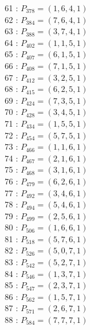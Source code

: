 \documentclass{article}
\begin{document}
{\begin{multicols}{3}
61 : $P_{378}=( 1, 6, 4, 1 )$\\
62 : $P_{384}=( 7, 6, 4, 1 )$\\
63 : $P_{388}=( 3, 7, 4, 1 )$\\
64 : $P_{402}=( 1, 1, 5, 1 )$\\
65 : $P_{407}=( 6, 1, 5, 1 )$\\
66 : $P_{408}=( 7, 1, 5, 1 )$\\
67 : $P_{412}=( 3, 2, 5, 1 )$\\
68 : $P_{415}=( 6, 2, 5, 1 )$\\
69 : $P_{424}=( 7, 3, 5, 1 )$\\
70 : $P_{428}=( 3, 4, 5, 1 )$\\
71 : $P_{434}=( 1, 5, 5, 1 )$\\
72 : $P_{454}=( 5, 7, 5, 1 )$\\
73 : $P_{466}=( 1, 1, 6, 1 )$\\
74 : $P_{467}=( 2, 1, 6, 1 )$\\
75 : $P_{468}=( 3, 1, 6, 1 )$\\
76 : $P_{479}=( 6, 2, 6, 1 )$\\
77 : $P_{492}=( 3, 4, 6, 1 )$\\
78 : $P_{494}=( 5, 4, 6, 1 )$\\
79 : $P_{499}=( 2, 5, 6, 1 )$\\
80 : $P_{506}=( 1, 6, 6, 1 )$\\
81 : $P_{518}=( 5, 7, 6, 1 )$\\
82 : $P_{526}=( 5, 0, 7, 1 )$\\
83 : $P_{542}=( 5, 2, 7, 1 )$\\
84 : $P_{546}=( 1, 3, 7, 1 )$\\
85 : $P_{547}=( 2, 3, 7, 1 )$\\
86 : $P_{562}=( 1, 5, 7, 1 )$\\
87 : $P_{571}=( 2, 6, 7, 1 )$\\
88 : $P_{584}=( 7, 7, 7, 1 )$\\
\end{multicols}


%


%


}%
\end{document}
